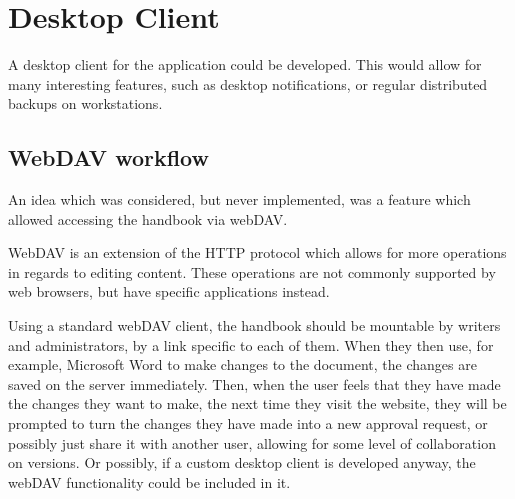 \documentclass[../../master.tex]{subfiles}
\begin{document}
\section{Desktop Client}
A desktop client for the application could be developed.
This would allow for many interesting features, such as desktop notifications, or regular distributed backups on workstations.
\subsection{WebDAV workflow}
An idea which was considered, but never implemented, was a feature which allowed accessing the handbook via webDAV.

WebDAV is an extension of the HTTP protocol which allows for more operations in regards to editing content.
These operations are not commonly supported by web browsers, but have specific applications instead.

Using a standard webDAV client, the handbook should be mountable by writers and administrators, by a link specific to each of them.
When they then use, for example, Microsoft Word to make changes to the document, the changes are saved on the server immediately.
Then, when the user feels that they have made the changes they want to make, the next time they visit the website, they will be prompted to turn the changes they have made into a new approval request, or possibly just share it with another user, allowing for some level of collaboration on versions.
Or possibly, if a custom desktop client is developed anyway, the webDAV functionality could be included in it.
\end{document}
